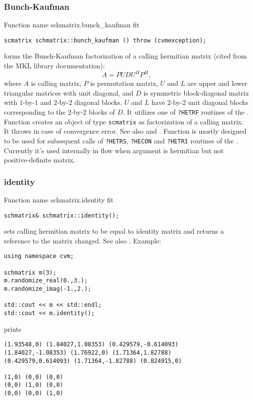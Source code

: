 \subsubsection{Bunch-Kaufman}
Function%
\pdfdest name {schmatrix.bunch_kaufman} fit
\begin{verbatim}
scmatrix schmatrix::bunch_kaufman () throw (cvmexception);
\end{verbatim}
forms the Bunch-Kaufman factorization of a calling hermitian matrix 
(cited from the MKL library documentation):
\begin{equation*}
A=PUDU^HP^H,
\end{equation*}
where $A$ is calling matrix,
$P$ is  permutation matrix, $U$ and $L$ are upper and lower triangular
matrices with unit diagonal, and $D$ is  symmetric 
block-diagonal matrix with $1$-by-$1$ and $2$-by-$2$
diagonal blocks. $U$ and $L$ have $2$-by-$2$ unit diagonal 
blocks corresponding to the $2$-by-$2$ blocks of $D$.
It utilizes one of \verb"?HETRF" routines of the
.
Function
creates an object of type \verb"scmatrix" as 
 factorization of a calling matrix.
It throws  
in case of convergence error.
See also
 and
.
Function is mostly designed to be used for subsequent calls
of \verb"?HETRS", \verb"?HECON" and \verb"?HETRI" routines of the
.
Currently it's used internally in  flow
when argument is hermitian but not positive-definite matrix.
\newpage




\subsubsection{identity}
Function%
\pdfdest name {schmatrix.identity} fit
\begin{verbatim}
schmatrix& schmatrix::identity();
\end{verbatim}
sets  calling hermitian matrix to be equal to identity matrix
and returns a reference to
the matrix changed. 
See also .
Example:
\begin{Verbatim}
using namespace cvm;

schmatrix m(3);
m.randomize_real(0.,3.);
m.randomize_imag(-1.,2.);

std::cout << m << std::endl;
std::cout << m.identity();
\end{Verbatim}
prints
\begin{Verbatim}
(1.93548,0) (1.84027,1.08353) (0.429579,-0.614093)
(1.84027,-1.08353) (1.76922,0) (1.71364,1.82788)
(0.429579,0.614093) (1.71364,-1.82788) (0.824915,0)

(1,0) (0,0) (0,0)
(0,0) (1,0) (0,0)
(0,0) (0,0) (1,0)
\end{Verbatim}
\newpage



